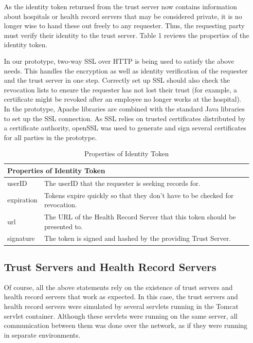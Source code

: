 As the identity token returned from the trust server now contains information about hospitals or health record servers that may be considered private, it is no longer wise to hand these out freely to any requester. Thus, the requesting party must verify their identity to the trust server. Table 1 reviews the properties of the identity token.

In our prototype, two-way SSL over HTTP is being used to satisfy the above needs. This handles the encryption as well as identity verification of the requester and the trust server in one step\cite{todd2003javaserver}. Correctly set up SSL should also check the revocation lists to ensure the requester has not lost their trust (for example, a certificate might be revoked after an employee no longer works at the hospital). In the prototype, Apache libraries\cite{apache} are combined with the standard Java libraries to set up the SSL connection. As SSL relies on trusted certificates distributed by a certificate authority, openSSL was used to generate and sign several certificates for all parties in the prototype\cite{manopenssl}.

\begin{center}
\begin{table}
  \begin{tabular}{ | l | l | }
    \hline
	 \multicolumn{2}{|l|}{Properties of Identity Token} \\ \hline
    userID & The userID that the requester is seeking records for. \\ \hline
    expiration & Tokens expire quickly so that they don't have to be checked for revocation. \\ \hline
    url & The URL of the Health Record Server that this token should be presented to. \\ \hline
    signature & The token is signed and hashed by the providing Trust Server. \\
    \hline
  \end{tabular}
  \caption{Properties of Identity Token}
\end{table}
\end{center}

\subsection{Trust Servers and Health Record Servers}

Of course, all the above statements rely on the existence of trust servers and health record servers that work as expected. In this case, the trust servers and health record servers were simulated by several servlets running in the Tomcat servlet container. Although these servlets were running on the same server, all communication between them was done over the network, as if they were running in separate environments.

